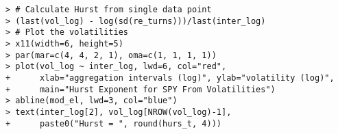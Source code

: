 \documentclass[10pt]{beamer}\usepackage[]{graphicx}\usepackage[]{color}
\makeatletter
\newenvironment{kframe}{%
 \def\at@end@of@kframe{}%
 \ifinner\ifhmode%
  \def\at@end@of@kframe{\end{minipage}}%
  \begin{minipage}{\columnwidth}%
 \fi\fi%
 \def\FrameCommand##1{\hskip\@totalleftmargin \hskip-\fboxsep
 \colorbox{shadecolor}{##1}\hskip-\fboxsep
     \hskip-\linewidth \hskip-\@totalleftmargin \hskip\columnwidth}%
 \MakeFramed {\advance\hsize-\width
   \@totalleftmargin\z@ \linewidth\hsize
   \@setminipage}}%
 {\par\unskip\endMakeFramed%
 \at@end@of@kframe}
\newenvironment{knitrout}{}{} %
\makeatother
\begin{document}
\begin{frame}[fragile,t]{\subsecname}
\begin{block}{}
\begin{columns}[T]
\begin{knitrout}
\begin{kframe}
\begin{verbatim}
> # Calculate Hurst from single data point
> (last(vol_log) - log(sd(re_turns)))/last(inter_log)
> # Plot the volatilities
> x11(width=6, height=5)
> par(mar=c(4, 4, 2, 1), oma=c(1, 1, 1, 1))
> plot(vol_log ~ inter_log, lwd=6, col="red",
+      xlab="aggregation intervals (log)", ylab="volatility (log)",
+      main="Hurst Exponent for SPY From Volatilities")
> abline(mod_el, lwd=3, col="blue")
> text(inter_log[2], vol_log[NROW(vol_log)-1], 
+      paste0("Hurst = ", round(hurs_t, 4)))
\end{verbatim}
\end{kframe}
\end{knitrout}
  \end{columns}
\end{block}

\end{frame}


\end{document}
